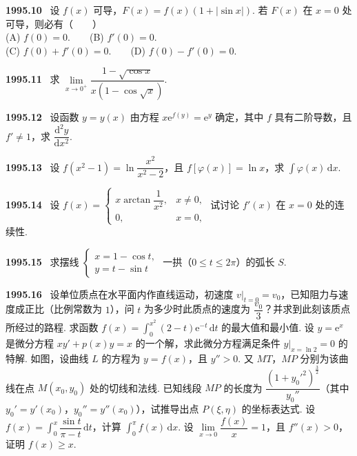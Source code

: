 \documentclass[UTF8,12pt]{ctexart}
\newcommand{\qn}[1]{\textbf{\large #1}\ }
\begin{document}
\vfill
\newpage
\qn{1995.10}
设 $f(x)$ 可导，$F(x)=f(x)(1+|\sin x|)$. 若 $F(x)$ 在 $x=0$ 处可导，则必有（　　）
\\
\noindent (A) $f(0)=0$.　　(B) $f'(0)=0$.
\\
\noindent (C) $f(0)+f'(0)=0$.　　(D) $f(0)-f'(0)=0$.

\vfill
\newpage
\qn{1995.11}
求 $\lim\limits_{x\to0^+}\dfrac{1-\sqrt{\cos x}}{x(1-\cos\sqrt{x})}$.

\vfill
\newpage
\qn{1995.12}
设函数 $y=y(x)$ 由方程 $x\mathrm{e}^{f(y)}=\mathrm{e}^y$ 确定，其中 $f$ 具有二阶导数，且 $f'\neq 1$，求 $\dfrac{\mathrm{d}^2y}{\mathrm{d}x^2}$.

\vfill
\newpage
\qn{1995.13}
设 $f(x^2-1)=\ln\dfrac{x^2}{x^2-2}$，且 $f[\varphi(x)]=\ln x$，求 $\int\varphi(x)\,\mathrm{d}x$.

\vfill
\newpage
\qn{1995.14}
设 $f(x)=\begin{cases}x\arctan\dfrac{1}{x^2}, & x\neq 0,\\ 0, & x=0,\end{cases}$ 试讨论 $f'(x)$ 在 $x=0$ 处的连续性.

\vfill
\newpage
\qn{1995.15}
求摆线 $\begin{cases}x=1-\cos t,\\ y=t-\sin t\end{cases}$ 一拱（$0\leqslant t\leqslant 2\pi$）的弧长 $S$.

\vfill
\newpage
\qn{1995.16}
设单位质点在水平面内作直线运动，初速度 $\left.v\right|_{t=0}=v_0$，已知阻力与速度成正比（比例常数为 $1$），问 $t$ 为多少时此质点的速度为 $\dfrac{v_0}{3}$？并求到此刻该质点所经过的路程.
求函数 $f(x)=\int_0^{x^2}(2-t)\mathrm{e}^{-t}\,\mathrm{d}t$ 的最大值和最小值.
设 $y=\mathrm{e}^x$ 是微分方程 $xy'+p(x)y=x$ 的一个解，求此微分方程满足条件 $\left.y\right|_{x=\ln 2}=0$ 的特解.
如图，设曲线 $L$ 的方程为 $y=f(x)$，且 $y''>0$. 又 $MT$，$MP$ 分别为该曲线在点 $M(x_0,y_0)$ 处的切线和法线. 已知线段 $MP$ 的长度为 $\dfrac{(1+{y_0'}^2)^{\frac{3}{2}}}{y_0''}$（其中 $y_0'=y'(x_0)$，$y_0''=y''(x_0)$），试推导出点 $P(\xi,\eta)$ 的坐标表达式.
设 $f(x)=\int_0^x\dfrac{\sin t}{\pi-t}\,\mathrm{d}t$，计算 $\int_0^\pi f(x)\,\mathrm{d}x$.
设 $\lim\limits_{x\to0}\dfrac{f(x)}{x}=1$，且 $f''(x)>0$，证明 $f(x)\geqslant x$.

\vfill
\newpage
\end{document}
